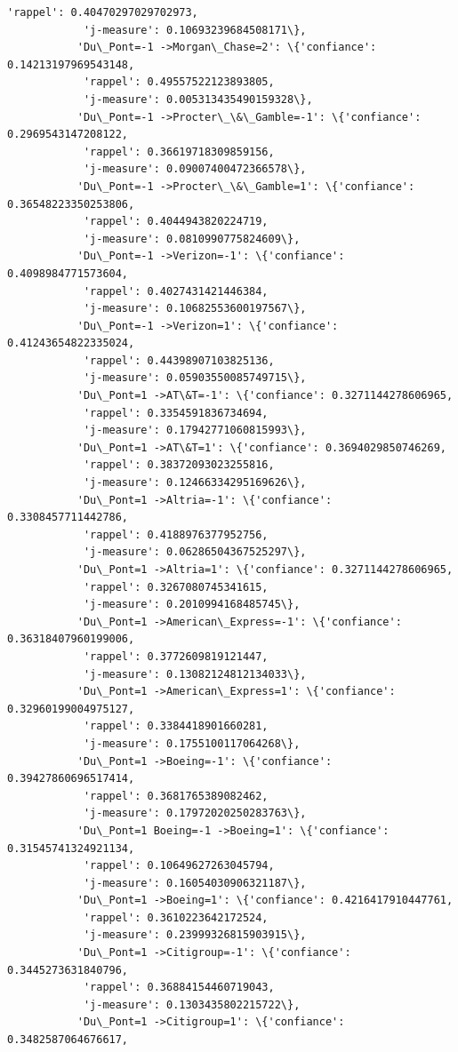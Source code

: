 \documentclass[11pt]{article}
\begin{document}
\begin{Verbatim}[commandchars=\\\{\}]
            'rappel': 0.40470297029702973,
            'j-measure': 0.10693239684508171\},
           'Du\_Pont=-1 ->Morgan\_Chase=2': \{'confiance': 0.14213197969543148,
            'rappel': 0.49557522123893805,
            'j-measure': 0.005313435490159328\},
           'Du\_Pont=-1 ->Procter\_\&\_Gamble=-1': \{'confiance': 0.2969543147208122,
            'rappel': 0.36619718309859156,
            'j-measure': 0.09007400472366578\},
           'Du\_Pont=-1 ->Procter\_\&\_Gamble=1': \{'confiance': 0.36548223350253806,
            'rappel': 0.4044943820224719,
            'j-measure': 0.0810990775824609\},
           'Du\_Pont=-1 ->Verizon=-1': \{'confiance': 0.4098984771573604,
            'rappel': 0.4027431421446384,
            'j-measure': 0.10682553600197567\},
           'Du\_Pont=-1 ->Verizon=1': \{'confiance': 0.41243654822335024,
            'rappel': 0.44398907103825136,
            'j-measure': 0.05903550085749715\},
           'Du\_Pont=1 ->AT\&T=-1': \{'confiance': 0.3271144278606965,
            'rappel': 0.3354591836734694,
            'j-measure': 0.17942771060815993\},
           'Du\_Pont=1 ->AT\&T=1': \{'confiance': 0.3694029850746269,
            'rappel': 0.38372093023255816,
            'j-measure': 0.12466334295169626\},
           'Du\_Pont=1 ->Altria=-1': \{'confiance': 0.3308457711442786,
            'rappel': 0.4188976377952756,
            'j-measure': 0.06286504367525297\},
           'Du\_Pont=1 ->Altria=1': \{'confiance': 0.3271144278606965,
            'rappel': 0.3267080745341615,
            'j-measure': 0.2010994168485745\},
           'Du\_Pont=1 ->American\_Express=-1': \{'confiance': 0.36318407960199006,
            'rappel': 0.3772609819121447,
            'j-measure': 0.13082124812134033\},
           'Du\_Pont=1 ->American\_Express=1': \{'confiance': 0.32960199004975127,
            'rappel': 0.3384418901660281,
            'j-measure': 0.1755100117064268\},
           'Du\_Pont=1 ->Boeing=-1': \{'confiance': 0.39427860696517414,
            'rappel': 0.3681765389082462,
            'j-measure': 0.17972020250283763\},
           'Du\_Pont=1 Boeing=-1 ->Boeing=1': \{'confiance': 0.31545741324921134,
            'rappel': 0.10649627263045794,
            'j-measure': 0.16054030906321187\},
           'Du\_Pont=1 ->Boeing=1': \{'confiance': 0.4216417910447761,
            'rappel': 0.3610223642172524,
            'j-measure': 0.23999326815903915\},
           'Du\_Pont=1 ->Citigroup=-1': \{'confiance': 0.3445273631840796,
            'rappel': 0.36884154460719043,
            'j-measure': 0.1303435802215722\},
           'Du\_Pont=1 ->Citigroup=1': \{'confiance': 0.3482587064676617,

\end{Verbatim}
\end{document}
